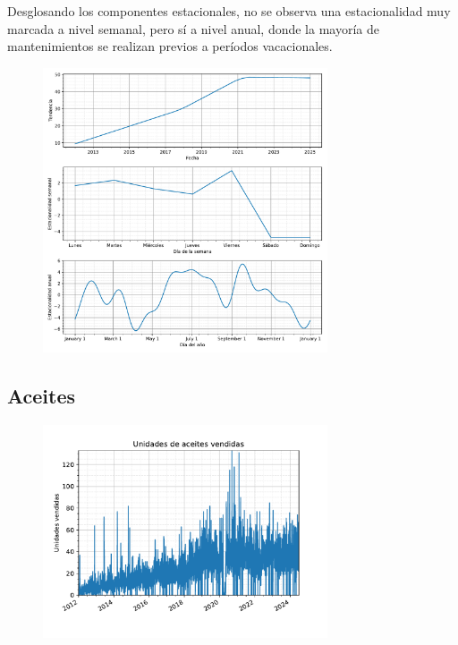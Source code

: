 Desglosando los componentes estacionales, no se observa una estacionalidad muy marcada a nivel semanal, pero sí a nivel anual, donde la mayoría de mantenimientos se realizan previos a períodos vacacionales.

\begin{figure}[H]
	{\includegraphics[width=0.75\textwidth]{imagenes/comps_filtros.pdf}}
\end{figure}

\subsection{Aceites}

\begin{figure}[H]
	{\includegraphics[width=0.75\textwidth]{imagenes/grafica_aceites.pdf}}
\end{figure}

